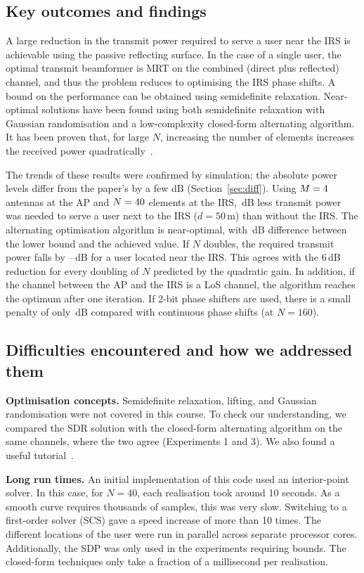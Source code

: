 \documentclass[11pt,a4paper]{article}
\begin{document}
\subsection{Key outcomes and findings}

A large reduction in the transmit power required to serve a user near the IRS is achievable using the
passive reflecting surface. In the case of a single user, the optimal transmit beamformer is MRT on the
combined (direct plus reflected) channel, and thus the problem reduces to optimising the IRS phase
shifts. A bound on the performance can be obtained using semidefinite relaxation. Near-optimal
solutions have been found using both semidefinite relaxation with Gaussian randomisation and a
low-complexity closed-form alternating algorithm. It has been proven that, for large $N$, increasing
the number of elements increases the received power quadratically~\cite{wu}.

The trends of these results were confirmed by simulation; the absolute power levels differ from the
paper's by a few dB (Section~\ref{sec:diff}). Using $M=4$ antennas at the AP and $N=40$
elements at the IRS, \saveFifty\,dB less transmit power was needed to serve a user next to the IRS
($d=50$\,m) than without the IRS. The alternating optimisation algorithm is near-optimal, with
\gapLB\,dB difference between the lower bound and the achieved value. If $N$ doubles, the required
transmit power falls by \dropA--\dropB\,dB for a user located near the IRS. This agrees with the
6\,dB reduction for every doubling of $N$ predicted by the quadratic gain. In addition, if the channel
between the AP and the IRS is a LoS channel, the algorithm reaches the optimum after one iteration. If
2-bit phase shifters are used, there is a small penalty of only \lossTwo\,dB compared with continuous
phase shifts (at $N=160$).

\subsection{Difficulties encountered and how we addressed them}

\textbf{Optimisation concepts.} Semidefinite relaxation, lifting, and Gaussian randomisation were not
covered in this course. To check our understanding, we compared the SDR solution with the closed-form alternating
algorithm on the same channels, where the two agree (Experiments 1 and 3). We also found a useful tutorial~\cite{luo}.

\textbf{Long run times.} An initial implementation of this code used an interior-point solver. In this
case, for $N=40$, each realisation took around 10 seconds. As a smooth curve requires thousands of
samples, this was very slow. Switching to a first-order solver (SCS) gave a speed increase of more than
10 times. The different locations of the user were run in parallel across separate processor cores.
Additionally, the SDP was only used in the experiments requiring bounds. The closed-form techniques
only take a fraction of a millisecond per realisation.
\end{document}
